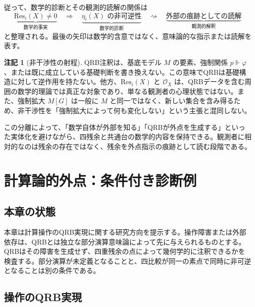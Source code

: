 \documentclass[a4paper,11pt]{ltjsarticle}
\theoremstyle{definition}
\newtheorem{remark}[definition]{注記}
\theoremstyle{plain}
\newcommand{\Res}{\mathrm{Res}}
\begin{document}
従って、数学的診断とその観測的読解の関係は
\begin{equation}
 \underbrace{\Res_i(X)\neq0}_{\text{数学的事実}}
 \quad\Longrightarrow\quad
 \underbrace{\eta_i(X)\text{ の非可逆性}}_{\text{数学的診断}}
 \quad\rightsquigarrow\quad
 \underbrace{\text{外部の痕跡としての読解}}_{\text{観測的解釈}}
 \label{eq:three-level-diagnosis}
\end{equation}
と整理される。最後の矢印は数学的含意ではなく、意味論的な指示または読解を表す。

\begin{remark}[非干渉性の射程]
QRB注釈は、基底モデル $M$ の要素、強制関係 $p\Vdash\varphi$、または既に成立している基礎判断を書き換えない。この意味でQRBは基礎構造に対して逆作用を持たない。他方、$\Res_i(X)$ と $\mathcal O_X$ は、QRBデータを含む周囲の数学的理論では真正な対象であり、単なる観測者の心理状態ではない。また、強制拡大 $M[G]$ は一般に $M$ と同一ではなく、新しい集合を含み得るため、非干渉性を「強制拡大によって何も変化しない」という主張と混同しない。
\end{remark}

この分離によって、「数学自体が外部を知る」「QRBが外点を生成する」といった実体化を避けながら、四残余と共通台の数学的内容を保持できる。観測者に相対的なのは残余の存在ではなく、残余を外点指示の痕跡として読む段階である。

\section{計算論的外点：条件付き診断例}

\subsection{本章の状態}

本章は計算操作のQRB実現に関する研究方向を提示する。操作障害または外部依存は、QRBとは独立な部分演算意味論によって先に与えられるものとする。QRBはその障害を生成せず、四重残余の点によって幾何学的に注釈できるかを検査する。部分演算が未定義となることと、四比較が同一の素点で同時に非可逆となることは別の条件である。

\subsection{操作のQRB実現}
\end{document}
